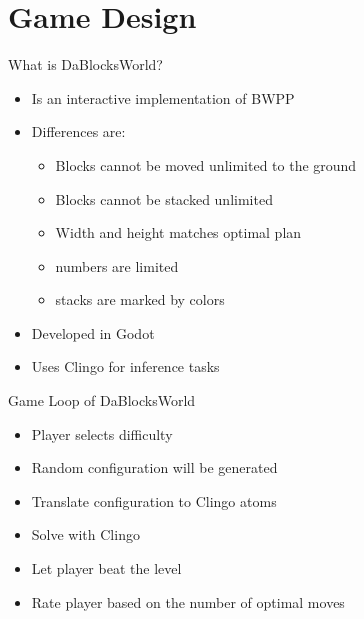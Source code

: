 \documentclass[12pt]{beamer}
\begin{document}
    \section{Game Design}
        \begin{frame}[fragile]{What is DaBlocksWorld?}
            \begin{itemize}
                \item Is an interactive implementation of BWPP
                \item Differences are: 
                \begin{itemize}
                    \item Blocks cannot be moved unlimited to the ground
                    \item Blocks cannot be stacked unlimited
                    \item Width and height matches optimal plan
                    \item numbers are limited
                    \item stacks are marked by colors
                \end{itemize}
                \item Developed in Godot
                \item Uses Clingo for inference tasks
            \end{itemize}
        \end{frame}

        \begin{frame}[fragile]{Game Loop of DaBlocksWorld}
            \begin{itemize}
                \item Player selects difficulty
                \item Random configuration will be generated
                \item Translate configuration to Clingo atoms
                \item Solve with Clingo
                \item Let player beat the level
                \item Rate player based on the number of optimal moves
            \end{itemize}
        \end{frame}
\end{document}
